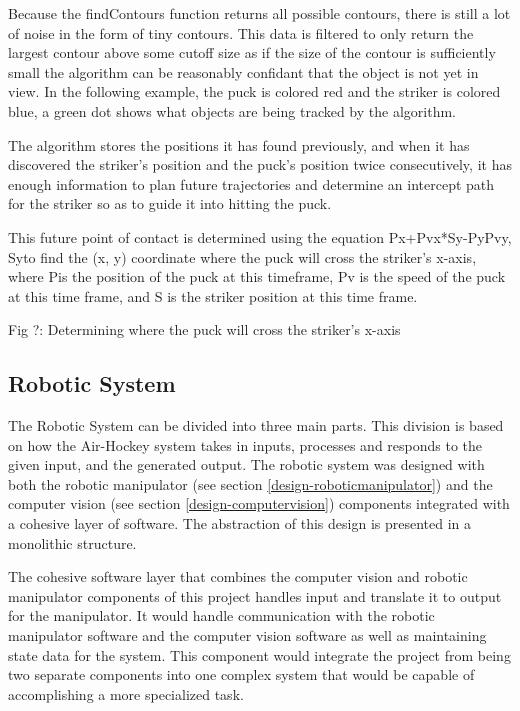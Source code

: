 \documentclass[letterpaper, 12 pt, conference]{ieeeconf}
\begin{document}
Because the findContours function returns all possible contours, there is still a lot of noise in the form of tiny contours. This data is filtered to only return the largest contour above some cutoff size as if the size of the contour is sufficiently small the algorithm can be reasonably confidant that the object is not yet in view. In the following example, the puck is colored red and the striker is colored blue, a green dot shows what objects are being tracked by the algorithm.


The algorithm stores the positions it has found previously, and when it has discovered the striker’s position and the puck’s position twice consecutively, it has enough information to plan future trajectories and determine an intercept path for the striker so as to guide it into hitting the puck.

This future point of contact is determined using the equation Px+Pvx*Sy-PyPvy, Syto find the (x, y) coordinate where the puck will cross the striker’s x-axis, where Pis the position of the puck at this timeframe, Pv is the speed of the puck at this time frame, and S is the striker position at this time frame. 



Fig ?: Determining where the puck will cross the striker’s x-axis

\subsection{Robotic System}
\label{design-roboticsystem}
The Robotic System can be divided into three main parts. This division is based on how the Air-Hockey system takes in inputs, processes and responds to the given input, and the generated output. The robotic system was designed with both the robotic manipulator (see section \ref{design-roboticmanipulator}) and the computer vision (see section \ref{design-computervision}) components integrated with a cohesive layer of software. The abstraction of this design is presented in a monolithic structure.  

The cohesive software layer that combines the computer vision and robotic manipulator components of this project handles input and translate it to output for the manipulator.  It would handle communication with the robotic manipulator software and the computer vision software as well as maintaining state data for the system.  This component would integrate the project from being two separate components into one complex system that would be capable of accomplishing a more specialized task.
\end{document}

